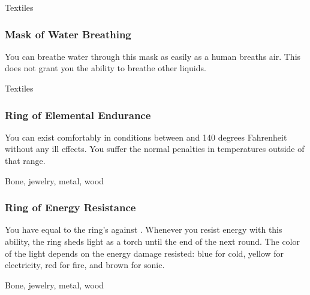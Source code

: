  Textiles


\lowercase{\hypertarget{item:Mask of Water Breathing}{}}\label{item:Mask of Water Breathing}
\hypertarget{item:Mask of Water Breathing}{\subsubsection{Mask of Water Breathing\hfill{}}}

You can breathe water through this mask as easily as a human breaths air.
This does not grant you the ability to breathe other liquids.



 Textiles


\lowercase{\hypertarget{item:Ring of Elemental Endurance}{}}\label{item:Ring of Elemental Endurance}
\hypertarget{item:Ring of Elemental Endurance}{\subsubsection{Ring of Elemental Endurance\hfill{}}}

You can exist comfortably in conditions between  and 140 degrees Fahrenheit without any ill effects.
You suffer the normal penalties in temperatures outside of that range.



 


 Bone, jewelry, metal, wood


\lowercase{\hypertarget{item:Ring of Energy Resistance}{}}\label{item:Ring of Energy Resistance}
\hypertarget{item:Ring of Energy Resistance}{\subsubsection{Ring of Energy Resistance\hfill{}}}

You have  equal to the ring's  against .
Whenever you resist energy with this ability, the ring sheds light as a torch until the end of the next round.
The color of the light depends on the energy damage resisted: blue for cold, yellow for electricity, red for fire, and brown for sonic.



 


 Bone, jewelry, metal, wood


